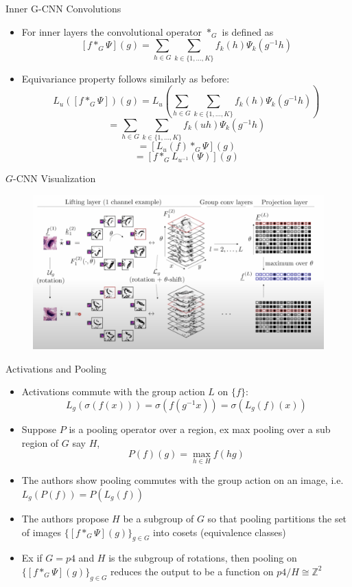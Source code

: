 \documentclass{beamer}
\newcommand{\Z}{\mathbb{Z}}
\begin{document}
\begin{frame}{Inner G-CNN Convolutions}
    \begin{itemize}
        \item For inner layers the convolutional operator $*_G$ is defined as 
        $$[f *_G \Psi](g) = \sum_{h \in G} \sum_{k \in \{1, \dots, K\}} f_k(h)\Psi_k(g^{-1}h)$$
        \item Equivariance property follows similarly as before:
        $$L_{u}([f *_G \Psi])(g) = L_{u}\left(\sum_{h \in G} \sum_{k \in \{1, \dots, K\}} f_k(h)\Psi_k(g^{-1}h)\right)$$
        $$= \sum_{h \in G} \sum_{k \in \{1, \dots, K\}} f_k(uh)\Psi_k(g^{-1}h)$$
        $$ = [L_{u}(f) *_G \Psi](g) $$
        $$ = [f *_G L_{u^{-1}}(\Psi)](g)$$
    \end{itemize}
\end{frame}

\begin{frame}{$G$-CNN Visualization}
    \begin{figure}
        \centering
        \includegraphics[width=\textwidth,height=\textheight,keepaspectratio]{Screenshot 2024-01-15 at 12.20.40 PM.png}
    \end{figure}
\end{frame}

\begin{frame}{Activations and Pooling}
    \begin{itemize}
        \item Activations commute with the group action $L$ on $\{f\}$: 
        $$L_g(\sigma(f(x))) = \sigma(f(g^{-1}x)) = \sigma(L_g(f)(x))$$
        \item Suppose $P$ is a pooling operator over a region, ex max pooling over a sub region of $G$ say $H$, $$P(f)(g) = \max_{h \in H} f(hg)$$
        \item The authors show pooling commutes with the group action on an image, i.e. $L_g(P(f)) = P(L_g(f))$
        \item The authors propose $H$ be a subgroup of $G$ so that pooling partitions the set of images $\{[f *_G \Psi](g)\}_{g\in G}$ into cosets (equivalence classes)
        \item Ex if $G = p4$ and $H$ is the subgroup of rotations, then pooling on $\{[f *_G \Psi](g)\}_{g\in G}$ reduces the output to be a function on $p4 / H \cong \Z^2$  
    \end{itemize}
\end{frame}
\end{document}
